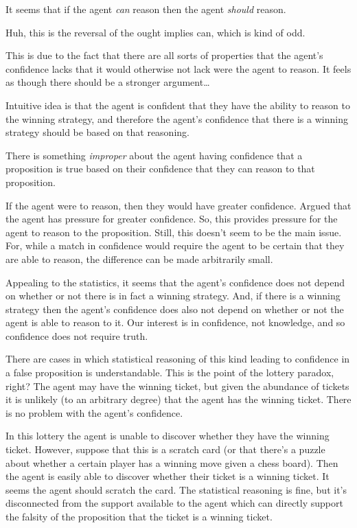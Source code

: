 \documentclass[10pt]{article}
\begin{document}
It seems that if the agent \emph{can} reason then the agent \emph{should} reason.
\begin{note}
  Huh, this is the reversal of the ought implies can, which is kind of odd.
\end{note}
This is due to the fact that there are all sorts of properties that the agent's confidence lacks that it would otherwise not lack were the agent to reason.
It feels as though there should be a stronger argument\dots

Intuitive idea is that the agent is confident that they have the ability to reason to the winning strategy, and therefore the agent's confidence that there is a winning strategy should be based on that reasoning.

There is something \emph{improper} about the agent having confidence that a proposition is true based on their confidence that they can reason to that proposition.

If the agent were to reason, then they would have greater confidence.
Argued that the agent has pressure for greater confidence.
So, this provides pressure for the agent to reason to the proposition.
Still, this doesn't seem to be the main issue.
For, while a match in confidence would require the agent to be certain that they are able to reason, the difference can be made arbitrarily small.

Appealing to the statistics, it seems that the agent's confidence does not depend on whether or not there is in fact a winning strategy.
And, if there is a winning strategy then the agent's confidence does also not depend on whether or not the agent is able to reason to it.
Our interest is in confidence, not knowledge, and so confidence does not require truth.

There are cases in which statistical reasoning of this kind leading to confidence in a false proposition is understandable.
This is the point of the lottery paradox, right?
The agent may have the winning ticket, but given the abundance of tickets it is unlikely (to an arbitrary degree) that the agent has the winning ticket.
There is no problem with the agent's confidence.

In this lottery the agent is unable to discover whether they have the winning ticket.
However, suppose that this is a scratch card (or that there's a puzzle about whether a certain player has a winning move given a chess board).
Then the agent is easily able to discover whether their ticket is a winning ticket.
It seems the agent should scratch the card.
The statistical reasoning is fine, but it's disconnected from the support available to the agent which can directly support the falsity of the proposition that the ticket is a winning ticket.
\end{document}
